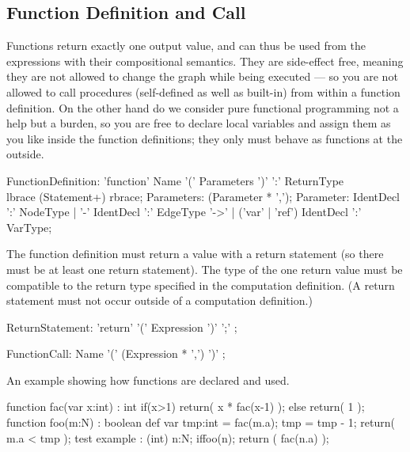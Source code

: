 \subsection{Function Definition and Call}\label{sub:functions}\label{sec:funccall} 

Functions return exactly one output value, and can thus be used from the expressions with their compositional semantics.
They are side-effect free, meaning they are not allowed to change the graph while being executed ---
so you are not allowed to call procedures (self-defined as well as built-in) from within a function definition.
On the other hand do we consider pure functional programming not a help but a burden, so you are free to declare local variables and assign them as you like inside the function definitions; they only must behave as functions at the outside.

\begin{rail} 
  FunctionDefinition: 
	'function' Name '(' Parameters ')' ':' ReturnType\\
	lbrace (Statement+) rbrace;
  Parameters: (Parameter * ',');
  Parameter: IdentDecl ':' NodeType |
  '-' IdentDecl ':' EdgeType '->' |
  ('var' | 'ref') IdentDecl ':' VarType;
\end{rail}

The function definition must return a value with a return statement (so there must be at least one return statement).
The type of the one return value must be compatible to the return type specified in the computation definition.
(A return statement must not occur outside of a computation definition.)

\begin{rail}
  ReturnStatement: 'return' '(' Expression ')' ';' ;
\end{rail}

\begin{rail}
  FunctionCall: Name '(' (Expression * ',') ')' ;
\end{rail}

\begin{example}
An example showing how functions are declared and used.
  \begin{grgen}
function fac(var x:int) : int
{
	if(x>1) {
		return( x * fac(x-1) );
	} else {
		return( 1 );
	}
}
function foo(m:N) : boolean
{
	def var tmp:int = fac(m.a);
	tmp = tmp - 1;
	return( m.a < tmp );
}
test example : (int)
{
	n:N;
	if{foo(n);}
	return ( fac(n.a) );
}
  \end{grgen}
\end{example}

